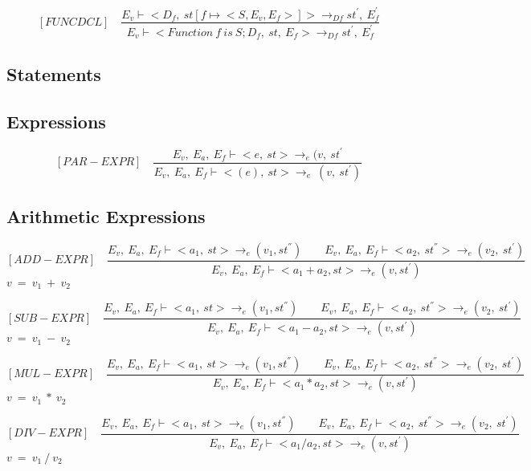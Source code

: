    	\[
   	[FUNCDCL] \quad
   	\dfrac{E_v \vdash <D_f, \ st[f \mapsto <S, E_v, E_f>]> \rightarrow_{Df} st^{'}, \ E_f^{'}}{E_v \vdash <Function \ f \ is \ S; D_f, \ st, \ E_f > \rightarrow_{Df} st^{'}, \ E_f^{'}}
   	\]
   	
   	\subsection{Statements}
   	
   	\subsection{Expressions}
   	
   	\[
   	[PAR-EXPR] \quad
   	\dfrac{E_v, \ E_a, \ E_f \vdash <e, \ st> \rightarrow_e (v, \ st^{'}}{E_v, \ E_a, \ E_f \vdash <(e), \ st> \rightarrow_e \ (v, \ st^{'})}
   	\]
   	
   	\subsection{Arithmetic Expressions}
   	
   	\[
   	[ADD-EXPR] \quad
   	\dfrac{E_v, \ E_a, \ E_f \vdash <a_1, \ st> \rightarrow_{e} (v_1, st^{''}) \qquad E_v, \ E_a, \ E_f \vdash <a_2, \ st^{''}> \rightarrow_e (v_2, \ st^{'})}{E_v, \ E_a, \ E_f \vdash <a_1 + a_2, st> \rightarrow_{e} (v, st^{'})}
   	\]
 	\begin{math}
   	v \ = \ v_1 \ + \ v_2
   	\end{math}
   	
   	\[
   	[SUB-EXPR] \quad
   	\dfrac{E_v, \ E_a, \ E_f \vdash <a_1, \ st> \rightarrow_{e} (v_1, st^{''}) \qquad E_v, \ E_a, \ E_f \vdash <a_2, \ st^{''}> \rightarrow_e (v_2, \ st^{'})}{E_v, \ E_a, \ E_f \vdash <a_1 - a_2, st> \rightarrow_{e} (v, st^{'})}
   	\]
   	\begin{math}
   	v \ = \ v_1 \ - \ v_2
   	\end{math}
   	
   	\[
   	[MUL-EXPR] \quad
   	\dfrac{E_v, \ E_a, \ E_f \vdash <a_1, \ st> \rightarrow_{e} (v_1, st^{''}) \qquad E_v, \ E_a, \ E_f \vdash <a_2, \ st^{''}> \rightarrow_e (v_2, \ st^{'})}{E_v, \ E_a, \ E_f \vdash <a_1 * a_2, st> \rightarrow_{e} (v, st^{'})}
   	\]
   	\begin{math}
   	v \ = \ v_1 \ * \ v_2
   	\end{math}
   	
   	\[
   	[DIV-EXPR] \quad
   	\dfrac{E_v, \ E_a, \ E_f \vdash <a_1, \ st> \rightarrow_{e} (v_1, st^{''}) \qquad E_v, \ E_a, \ E_f \vdash <a_2, \ st^{''}> \rightarrow_e (v_2, \ st^{'})}{E_v, \ E_a, \ E_f \vdash <a_1 / a_2, st> \rightarrow_{e} (v, st^{'})}
   	\]
   	\begin{math}
   	v \ = \ v_1 \ / \ v_2
   	\end{math}   	   	

